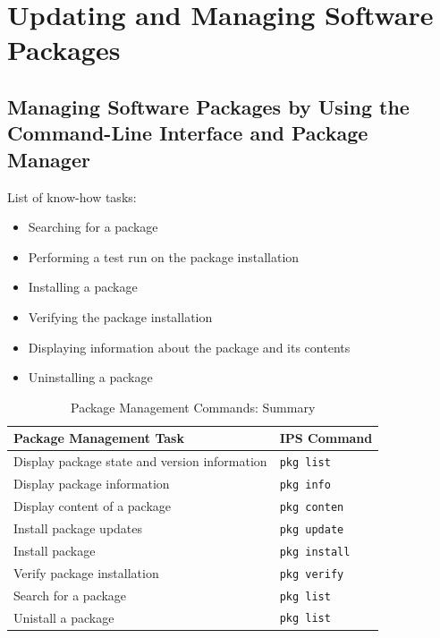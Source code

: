 \documentclass[10pt,a4paper,twoside]{report}
\begin{document}
\chapter{Updating and Managing Software Packages}
\section{Managing Software Packages by Using the Command-Line Interface and Package Manager}
List of know-how tasks:
\begin{itemize}
\item Searching for a package
\item Performing a test run on the package installation
\item Installing a package
\item Verifying the package installation
\item Displaying information about the package and its contents
\item Uninstalling a package
\end{itemize}

\begin{table}
\begin{tabular}{|p{}|p{}|}
\hline
\rowcolor{LightBlue}
\textbf{Package Management Task} & \textbf{IPS Command}\\
\hline
\rowcolor{LightYellow}
Display package state and version information & \verb+pkg list+\\
\hline
\rowcolor{LightYellow}
Display package information & \verb+pkg info+\\
\hline
\rowcolor{LightYellow}
Display content of a package & \verb+pkg conten+\\
\hline
\rowcolor{LightYellow}
Install package updates & \verb+pkg update+\\
\hline
\rowcolor{LightYellow}
Install package & \verb+pkg install+\\
\hline
\rowcolor{LightYellow}
Verify package installation & \verb+pkg verify+\\
\hline
\rowcolor{LightYellow}
Search for a package & \verb+pkg list+\\
\hline
\rowcolor{LightYellow}
Unistall a package & \verb+pkg list+\\
\hline
\end{tabular}
\caption{Package Management Commands: Summary}
\end{table}
\end{document}
